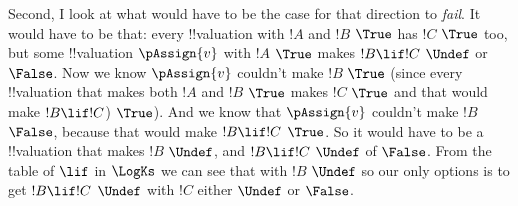\documentclass[../../../../include/open-logic-section]{subfiles}
\begin{document}
\begin{prob}
\begin{ans}
\begin{enumerate}
{	Second, I look 
	at what would have to be the case for that direction
	 to \emph{fail}. It would have to be that: every !!{valuation} with 
	 $!A$ and $!B$ $\True$
	has $!C$ $\True$ too, but some !!{valuation} $\pAssign{v}$ with $!A$ 
	$\True$ makes $!B \lif !C$ $\Undef$ or $\False$. Now we know $\pAssign{v}$
	couldn't make $!B$ $\True$ (since every !!{valuation} that makes both $!A$
	and $!B$ $\True$ makes $!C$ $\True$ and that would make $!B \lif !C$) $\True$).
	And we know that $\pAssign{v}$ couldn't make $!B$ $\False$, because 
	that would make $!B \lif !C$ $\True$. So it would have to be a 
	!!{valuation} that makes $!B$ $\Undef$, and $!B \lif !C$ $\Undef$
	of $\False$. From the table of $\lif$ in $\LogKs$ we can see that
	with $!B$ $\Undef$ so our only options is to get $!B \lif !C$ $\Undef$
	with $!C$ either $\Undef$ or $\False$. 

}
\end{enumerate}
\end{ans}
\end{prob}
\end{document}
